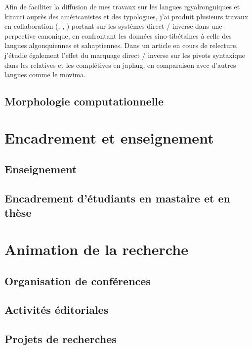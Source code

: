 \documentclass[oldfontcommands,oneside,a4paper,11pt]{article}
\begin{document}
Afin de faciliter la diffusion de mes travaux sur les langues rgyalronguiques et kiranti auprès des américanistes et des typologues, j'ai produit  plusieurs travaux en collaboration (\citealt{jacques14inverse}, \citealt{jacques15directionality},   \citealt{walther14inv.canon}) portant sur les systèmes direct / inverse dans une perpective canonique, en confrontant les données sino-tibétaines à celle des langues  algonquiennes et sahaptiennes.   Dans un article en cours de relecture, j'étudie également l'effet du marquage direct / inverse sur les pivots syntaxique dans les relatives et les complétives en japhug, en comparaison avec d'autres langues comme le movima.
  
\subsection{Morphologie computationnelle}  \label{sec:morpho}
  
 \citet{jacques12khaling}
 \citet{walther14compactness}
 
\section{Encadrement et enseignement}

\subsection{Enseignement} \label{sec:enseignement}

\subsection{Encadrement d'étudiants en mastaire et en thèse} \label{sec:theses}
\citet{gongxun14agreement}
\citet{gong14prosodic.tibetan}
\citet{gong14prenasalized}

\citet{lai14caus}
\citet{lai14person}
\citet{lai13fuyin}
\citet{lai13affixale}
\section{Animation de la recherche} \label{sec:animation}

\subsection{Organisation de conférences} \label{sec:conf}

\subsection{Activités éditoriales}\label{sec:editorial}

\subsection{Projets de recherches} \label{sec:projets}




 
\end{document}

